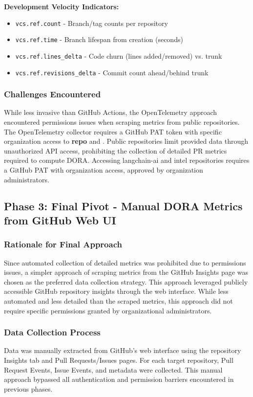 \documentclass[12pt]{article}
\begin{document}
\textbf{Development Velocity Indicators:}
\begin{itemize}
  \item \texttt{vcs.ref.count} - Branch/tag counts per repository
  \item \texttt{vcs.ref.time} - Branch lifespan from creation (seconds)
  \item \texttt{vcs.ref.lines\_delta} - Code churn (lines
    added/removed) vs. trunk
  \item \texttt{vcs.ref.revisions\_delta} - Commit count ahead/behind trunk
\end{itemize}

\subsubsection{Challenges Encountered}
While less invasive than GitHub Actions, the OpenTelemetry approach
encountered permissions
issues when scraping metrics from public repositories. The
OpenTelemetry collector requires
a GitHub PAT token with specific organization access to \textbf{repo}
and .
Public repositories limit provided data through unauthorized API
access, prohibiting the collection
of detailed PR metrics required to compute DORA. Accessing
langchain-ai and intel repositories requires
a GitHub PAT with organization access, approved by organization administrators.

\subsection{Phase 3: Final Pivot - Manual DORA Metrics from GitHub Web UI}

\subsubsection{Rationale for Final Approach}
Since automated collection of detailed metrics was prohibited due to
permissions issues,
a simpler approach of scraping metrics from the GitHub Insights page was chosen
as the preferred data collection strategy. This approach leveraged
publicly accessible
GitHub repository insights through the web interface. While less
automated and less detailed
than the scraped metrics, this approach did not require specific
permissions granted by
organizational administrators.

\subsubsection{Data Collection Process}
Data was manually extracted from GitHub's web interface using the
repository Insights tab and Pull Requests/Issues pages. For each
target repository, Pull Request Events, Issue Events, and metadata
were collected.
This manual approach bypassed all
authentication and permission barriers encountered in previous phases.
\end{document}

